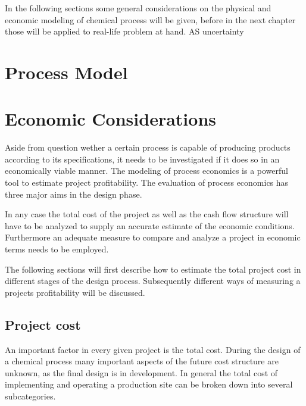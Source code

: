 In the following sections some general considerations on the physical and economic modeling of chemical process will be given, before in the next chapter those will be applied to real-life problem at hand. AS uncertainty 

\section{Process Model}
\label{sec:process_model}

\section{Economic Considerations}
\label{sec:uncertainty}

Aside from question wether a certain process is capable of producing products according to its 
specifications, it needs to be investigated if it does so in an economically viable manner. The modeling 
of process economics is a powerful tool to estimate project profitability. The evaluation of process 
economics has three major aims in the design phase. 

%

In any case the total cost of the project as well as the cash flow structure will have to be analyzed to supply 
an accurate estimate of the economic conditions. Furthermore an adequate measure to compare and 
analyze a project in economic terms needs to be employed. 

The following sections will first describe how to estimate the total project cost in different stages of the 
design process. Subsequently different ways of measuring a projects profitability will be discussed. 

\subsection{Project cost}
An important factor in every given project is the total cost. During the design of a chemical process many 
important aspects of the future cost structure are unknown, as the final design is in development. In 
general the total cost of implementing and operating a production site can be broken down into several 
subcategories. 

